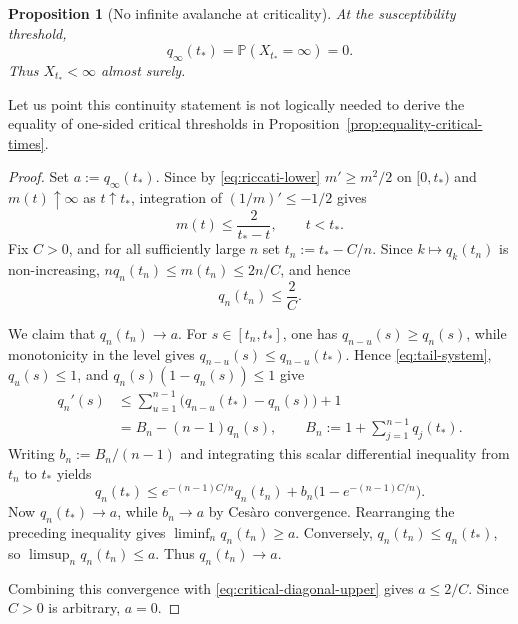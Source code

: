 \documentclass[11pt,a4paper]{amsart}
\newtheorem{proposition}[theorem]{Proposition}
\theoremstyle{remark}
\begin{document}
\begin{proposition}[No infinite avalanche at criticality]
\label{prop:critical-no-infinity}
At the susceptibility threshold,
\[
        q_\infty(t_*)=\mathbb{P}(X_{t_*}=\infty)=0.
\]
Thus $X_{t_*}<\infty$ almost surely.
\end{proposition}

Let us point this continuity statement is not logically needed to derive the 
equality of one-sided critical thresholds in Proposition~\ref{prop:equality-critical-times}.






\begin{proof}
Set $a:=q_\infty(t_*)$. Since by \eqref{eq:riccati-lower} $m'\geq m^2/2$ on $[0,t_*)$ and
$m(t)\uparrow\infty$ as $t\uparrow t_*$, integration of
$(1/m)'\leq-1/2$ gives
\begin{equation}
\label{eq:critical-mean-upper}
        m(t)\leq\frac{2}{t_*-t},
        \qquad t<t_*.
\end{equation}
Fix $C>0$, and for all sufficiently large $n$ set
$t_n:=t_*-C/n$. Since \(k\mapsto q_k(t_n)\) is non-increasing, 
$nq_n(t_n)\leq m(t_n)\leq2n/C$, and hence
\begin{equation}
\label{eq:critical-diagonal-upper}
        q_n(t_n)\leq\frac{2}{C}.
\end{equation}

We claim that $q_n(t_n)\to a$. For $s\in[t_n,t_*]$, one has
$q_{n-u}(s)\geq q_n(s)$, while monotonicity in the level gives
$q_{n-u}(s)\leq q_{n-u}(t_*)$. Hence
\eqref{eq:tail-system}, $q_u(s)\leq1$, and
$q_n(s)(1-q_n(s))\leq1$ give
\[
\begin{aligned}
        q_n'(s)
        &\leq
        \sum_{u=1}^{n-1}\bigl(q_{n-u}(t_*)-q_n(s)\bigr)+1\\
        &=B_n-(n-1)q_n(s),
        \qquad
        B_n:=1+\sum_{j=1}^{n-1}q_j(t_*).
\end{aligned}
\]
Writing $b_n:=B_n/(n-1)$ and integrating this scalar differential
inequality from $t_n$ to $t_*$ yields
\[
        q_n(t_*)
        \leq
        e^{-(n-1)C/n}q_n(t_n)
        +b_n\bigl(1-e^{-(n-1)C/n}\bigr).
\]
Now $q_n(t_*)\to a$, while $b_n\to a$ by Ces\`aro convergence.
Rearranging the preceding inequality gives
$\liminf_n q_n(t_n)\geq a$. Conversely,
$q_n(t_n)\leq q_n(t_*)$, so $\limsup_n q_n(t_n)\leq a$.
Thus $q_n(t_n)\to a$.

Combining this convergence with \eqref{eq:critical-diagonal-upper}
gives $a\leq2/C$. Since $C>0$ is arbitrary, $a=0$. 
\end{proof}
\end{document}
